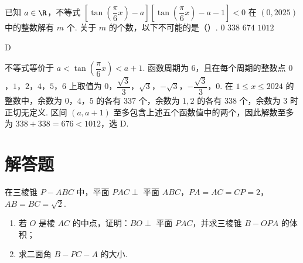 \documentclass[UTF8,a4paper,oneside,11pt]{ctexbook}
\begin{document}
\begin{problem}
已知 \(a\in\R\)，不等式 \(\left[\tan\left(\dfrac\pi6x\right)-a\right]\left[\tan\left(\dfrac\pi6x\right)-a-1\right]<0\) 在 \((0,2025)\) 中的整数解有 \(m\) 个. 关于 \(m\) 的个数，以下不可能的是（\quad）.
\choices
    {\(0\)}
    {\(338\)}
    {\(674\)}
    {\(1012\)}
\end{problem}

\begin{answer}
D
\end{answer}

\begin{solution}
不等式等价于 \(a<\tan\left(\dfrac\pi6x\right)<a+1\). 函数周期为 \(6\)，且在每个周期的整数点 \(0\)，\(1\)，\(2\)，\(4\)，\(5\)，\(6\) 上取值为 \(0\)，\(\dfrac{\sqrt3}{3}\)，\(\sqrt3\)，\(-\sqrt3\)，\(-\dfrac{\sqrt3}{3}\)，\(0\). 在 \(1\le x\le2024\) 的整数中，余数为 \(0\)，\(4\)，\(5\) 的各有 \(337\) 个，余数为 \(1,2\) 的各有 \(338\) 个，余数为 \(3\) 时正切无定义. 区间 \((a,a+1)\) 至多包含上述五个函数值中的两个，因此解数至多为 \(338+338=676<1012\)，选 D.
\end{solution}

\section{解答题}

\begin{problem}
在三棱锥 \(P-ABC\) 中，平面 \(PAC\perp\) 平面 \(ABC\)，\(PA=AC=CP=2\)，\(AB=BC=\sqrt2\).

\begin{enumerate}
\item 若 \(O\) 是棱 \(AC\) 的中点，证明：\(BO\perp\) 平面 \(PAC\)，并求三棱锥 \(B-OPA\) 的体积；
\item 求二面角 \(B-PC-A\) 的大小.
\end{enumerate}

\end{problem}
\end{document}
